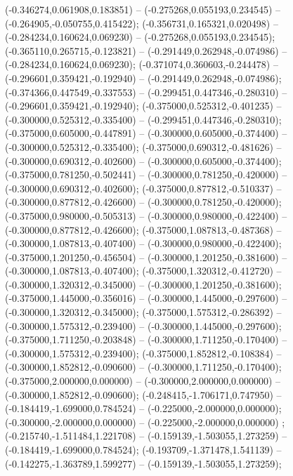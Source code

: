  (-0.346274,0.061908,0.183851) -- (-0.275268,0.055193,0.234545) -- (-0.264905,-0.050755,0.415422);
 (-0.356731,0.165321,0.020498) -- (-0.284234,0.160624,0.069230) -- (-0.275268,0.055193,0.234545);
 (-0.365110,0.265715,-0.123821) -- (-0.291449,0.262948,-0.074986) -- (-0.284234,0.160624,0.069230);
 (-0.371074,0.360603,-0.244478) -- (-0.296601,0.359421,-0.192940) -- (-0.291449,0.262948,-0.074986);
 (-0.374366,0.447549,-0.337553) -- (-0.299451,0.447346,-0.280310) -- (-0.296601,0.359421,-0.192940);
 (-0.375000,0.525312,-0.401235) -- (-0.300000,0.525312,-0.335400) -- (-0.299451,0.447346,-0.280310);
 (-0.375000,0.605000,-0.447891) -- (-0.300000,0.605000,-0.374400) -- (-0.300000,0.525312,-0.335400);
 (-0.375000,0.690312,-0.481626) -- (-0.300000,0.690312,-0.402600) -- (-0.300000,0.605000,-0.374400);
 (-0.375000,0.781250,-0.502441) -- (-0.300000,0.781250,-0.420000) -- (-0.300000,0.690312,-0.402600);
 (-0.375000,0.877812,-0.510337) -- (-0.300000,0.877812,-0.426600) -- (-0.300000,0.781250,-0.420000);
 (-0.375000,0.980000,-0.505313) -- (-0.300000,0.980000,-0.422400) -- (-0.300000,0.877812,-0.426600);
 (-0.375000,1.087813,-0.487368) -- (-0.300000,1.087813,-0.407400) -- (-0.300000,0.980000,-0.422400);
 (-0.375000,1.201250,-0.456504) -- (-0.300000,1.201250,-0.381600) -- (-0.300000,1.087813,-0.407400);
 (-0.375000,1.320312,-0.412720) -- (-0.300000,1.320312,-0.345000) -- (-0.300000,1.201250,-0.381600);
 (-0.375000,1.445000,-0.356016) -- (-0.300000,1.445000,-0.297600) -- (-0.300000,1.320312,-0.345000);
 (-0.375000,1.575312,-0.286392) -- (-0.300000,1.575312,-0.239400) -- (-0.300000,1.445000,-0.297600);
 (-0.375000,1.711250,-0.203848) -- (-0.300000,1.711250,-0.170400) -- (-0.300000,1.575312,-0.239400);
 (-0.375000,1.852812,-0.108384) -- (-0.300000,1.852812,-0.090600) -- (-0.300000,1.711250,-0.170400);
 (-0.375000,2.000000,0.000000) -- (-0.300000,2.000000,0.000000) -- (-0.300000,1.852812,-0.090600);
 (-0.248415,-1.706171,0.747950) -- (-0.184419,-1.699000,0.784524) -- (-0.225000,-2.000000,0.000000);
 (-0.300000,-2.000000,0.000000) -- (-0.225000,-2.000000,0.000000) ;
 (-0.215740,-1.511484,1.221708) -- (-0.159139,-1.503055,1.273259) -- (-0.184419,-1.699000,0.784524);
 (-0.193709,-1.371478,1.541139) -- (-0.142275,-1.363789,1.599277) -- (-0.159139,-1.503055,1.273259);
